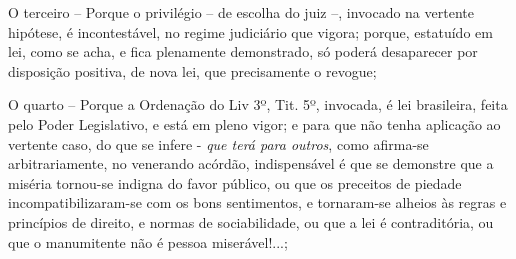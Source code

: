 O terceiro -- Porque o privilégio -- de escolha do juiz --, invocado na
vertente hipótese, é incontestável, no regime judiciário que vigora;
porque, estatuído em lei, como se acha, e fica plenamente demonstrado,
só poderá desaparecer por disposição positiva, de nova lei, que
precisamente o revogue;

O quarto -- Porque a Ordenação do Liv 3º, Tit. 5º, invocada, é lei
brasileira, feita pelo Poder Legislativo, e está em pleno vigor; e para
que não tenha aplicação ao vertente caso, do que se infere - \emph{que
terá para outros}, como afirma-se arbitrariamente, no venerando acórdão,
indispensável é que se demonstre que a miséria tornou-se indigna do
favor público, ou que os preceitos de piedade incompatibilizaram-se com
os bons sentimentos, e tornaram-se alheios às regras e princípios de
direito, e normas de sociabilidade, ou que a lei é contraditória, ou que
o manumitente não é pessoa miserável!...;

